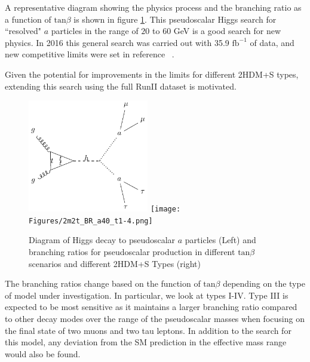 A representative diagram showing the physics process and the branching ratio as a function of $\text{tan}\beta$ is shown in figure \ref{fig:feynman_haa}. This pseudoscalar Higgs search for ``resolved" $a$ particles in the range of $20$ to $60$ GeV is a good search for new physics.
In 2016 this general search was carried out with 35.9 $\text{fb}^{-1}$ of data, and new competitive limits were set in reference ~\cite{CMS-HIG-17-029}.

Given the potential for improvements in the limits for different 2HDM+S types, extending this search using the full RunII dataset is motivated. 


\begin{figure}[ht!b]
  \includegraphics[width=0.47\textwidth]{Figures/feynman_haa.pdf}
  \texttt{[image: Figures/2m2t\_BR\_a40\_t1-4.png]}\\
    \caption{\label{fig:feynman_haa} Diagram of Higgs decay to pseudoscalar $a$ particles (Left) and branching ratios for pseudoscalar production in different $\text{tan}\beta$ scenarios and different 2HDM+S Types (right)}
\end{figure}

The branching ratios change based on the function of $\text{tan}\beta$ depending on the type of model under investigation. In particular, we look at types I-IV. Type III is expected to be most sensitive as it maintains a larger branching ratio compared to other decay modes over the range of the pseudoscalar masses when focusing on the final state of two muons and two tau leptons. In addition to the search for this model, any deviation from the SM prediction in the effective mass range would also be found.

